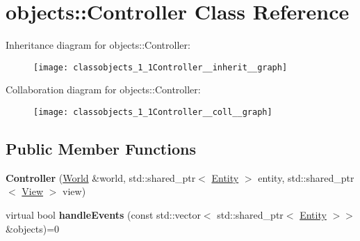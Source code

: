 \hypertarget{classobjects_1_1Controller}{}\section{objects\+:\+:Controller Class Reference}
\label{classobjects_1_1Controller}


Inheritance diagram for objects\+:\+:Controller\+:\nopagebreak
\begin{figure}[H]
\begin{center}
\leavevmode
\texttt{[image: classobjects\_1\_1Controller\_\_inherit\_\_graph]}
\end{center}
\end{figure}


Collaboration diagram for objects\+:\+:Controller\+:\nopagebreak
\begin{figure}[H]
\begin{center}
\leavevmode
\texttt{[image: classobjects\_1\_1Controller\_\_coll\_\_graph]}
\end{center}
\end{figure}
\subsection*{Public Member Functions}
\begin{DoxyCompactItemize}
\item 
\mbox{\label{classobjects_1_1Controller_ab13d103795b6d18dff0849e94c043e3f}}
{\bfseries Controller} (\hyperlink{classWorld}{World} \&world, std\+::shared\+\_\+ptr$<$ \hyperlink{classobjects_1_1Entity}{Entity} $>$ entity, std\+::shared\+\_\+ptr$<$ \hyperlink{classobjects_1_1View}{View} $>$ view)
\item 
\mbox{\label{classobjects_1_1Controller_a8e92d8a8e3b215295708a4cf25abcf4f}}
virtual bool {\bfseries handle\+Events} (const std\+::vector$<$ std\+::shared\+\_\+ptr$<$ \hyperlink{classobjects_1_1Entity}{Entity} $>$$>$ \&objects)=0
\end{DoxyCompactItemize}
